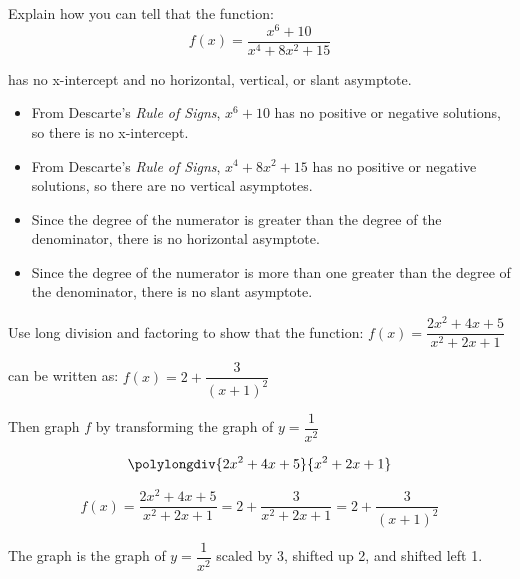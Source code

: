 \documentclass[fleqn,addpoints]{exam}
\begin{document}
\begin{questions}

\question
Explain how you can tell that the function:
\[
  f(x) = \frac{x^6 + 10}{x^4 + 8x^2+15}
\]

has no x-intercept and no horizontal, vertical, or slant asymptote.

\begin{solution}
\begin{itemize}

\item From Descarte's {\em Rule of Signs}, $x^6+10$ has no positive or negative solutions, so there is no x-intercept.

\item From Descarte's {\em Rule of Signs}, $x^4+8x^2+15$ has no positive or negative solutions, so there are no vertical
  asymptotes.

\item Since the degree of the numerator is greater than the degree of the denominator, there is no horizontal asymptote.

\item Since the degree of the numerator is more than one greater than the degree of the denominator, there is no slant asymptote.

\end{itemize}

\end{solution}

\pagebreak

\question
Use long division and factoring to show that the function:
$f(x) = \dfrac{2x^2+4x+5}{x^2+2x+1}$

can be written as: $f(x) = 2 + \dfrac{3}{(x+1)^2}$

Then graph $f$ by transforming the graph of $y=\dfrac{1}{x^2}$

\begin{solution}
\[
\polylongdiv{2x^2+4x+5}{x^2+2x+1}
\]

\[
  f(x) = \frac{2x^2+4x+5}{x^2+2x+1} = 2 + \frac{3}{x^2+2x+1} = 2 + \frac{3}{(x+1)^2}
\]

The graph is the graph of $y=\dfrac{1}{x^2}$ scaled by 3, shifted up 2, and shifted left 1.
\end{solution}


\end{questions}
\end{document}
